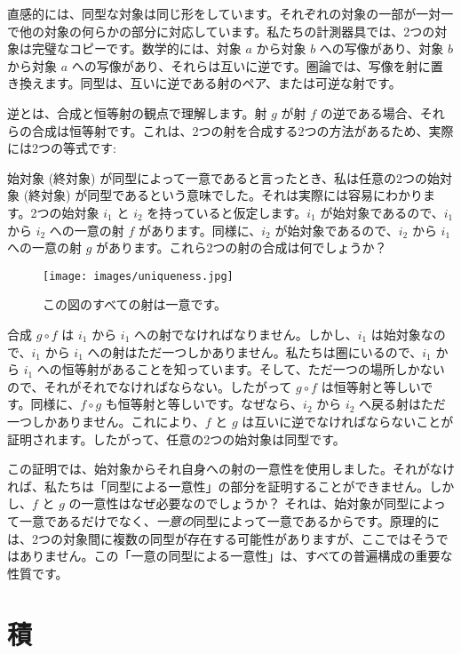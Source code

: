 直感的には、同型な対象は同じ形をしています。それぞれの対象の一部が一対一で他の対象の何らかの部分に対応しています。私たちの計測器具では、2つの対象は完璧なコピーです。数学的には、対象 $a$ から対象 $b$ への写像があり、対象 $b$ から対象 $a$ への写像があり、それらは互いに逆です。圏論では、写像を射に置き換えます。同型は、互いに逆である射のペア、または可逆な射です。

逆とは、合成と恒等射の観点で理解します。射 $g$ が射 $f$ の逆である場合、それらの合成は恒等射です。これは、2つの射を合成する2つの方法があるため、実際には2つの等式です: 

始対象 (終対象) が同型によって一意であると言ったとき、私は任意の2つの始対象 (終対象) が同型であるという意味でした。それは実際には容易にわかります。2つの始対象 $i_{1}$ と $i_{2}$ を持っていると仮定します。$i_{1}$ が始対象であるので、$i_{1}$ から $i_{2}$ への一意の射 $f$ があります。同様に、$i_{2}$ が始対象であるので、$i_{2}$ から $i_{1}$ への一意の射 $g$ があります。これら2つの射の合成は何でしょうか？

\begin{figure}[H]
  \centering
  \texttt{[image: images/uniqueness.jpg]}
  \caption{この図のすべての射は一意です。}
\end{figure}

\noindent
合成 $g \circ f$ は $i_{1}$ から $i_{1}$ への射でなければなりません。しかし、$i_{1}$ は始対象なので、$i_{1}$ から $i_{1}$ への射はただ一つしかありません。私たちは圏にいるので、$i_{1}$ から $i_{1}$ への恒等射があることを知っています。そして、ただ一つの場所しかないので、それがそれでなければならない。したがって $g \circ f$ は恒等射と等しいです。同様に、$f \circ g$ も恒等射と等しいです。なぜなら、$i_{2}$ から $i_{2}$ へ戻る射はただ一つしかありません。これにより、$f$ と $g$ は互いに逆でなければならないことが証明されます。したがって、任意の2つの始対象は同型です。

この証明では、始対象からそれ自身への射の一意性を使用しました。それがなければ、私たちは「同型による一意性」の部分を証明することができません。しかし、$f$ と $g$ の一意性はなぜ必要なのでしょうか？ それは、始対象が同型によって一意であるだけでなく、\emph{一意の}同型によって一意であるからです。原理的には、2つの対象間に複数の同型が存在する可能性がありますが、ここではそうではありません。この「一意の同型による一意性」は、すべての普遍構成の重要な性質です。

\section{積}

